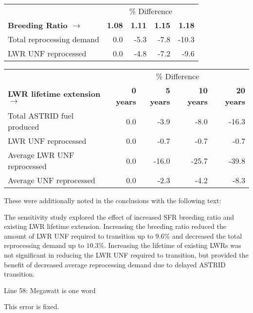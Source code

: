 \documentclass[answers,11pt]{exam}
\begin{document}
\begin{questions}
\begin{solution}
	\begin{tabular}{lrrrr}
		\hline
                & \multicolumn{4}{c}{\% Difference} \\
		\textbf{Breeding Ratio $\longrightarrow$}& \textbf{1.08}& \textbf{1.11} & \textbf{1.15} & \textbf{1.18} \\
		\hline
		Total reprocessing demand & 0.0 & -5.3 & -7.8 & -10.3 \\
		\gls{LWR} \gls{UNF} reprocessed & 0.0  & -4.8 & -7.2 & -9.6 \\
		\hline
	\end{tabular}


	\begin{tabular}{lrrrr}
		\hline
		& \multicolumn{4}{c}{\% Difference} \\
		\textbf{\gls{LWR} lifetime extension $\longrightarrow$}& \textbf{0 years}& \textbf{5 years} & \textbf{10 years} & \textbf{20 years} \\
		\hline
		Total \gls{ASTRID} fuel produced & 0.0 & -3.9 & -8.0 & -16.3 \\
		\gls{LWR} \gls{UNF} reprocessed & 0.0  & -0.7 & -0.7 & -0.7 \\
		Average \gls{LWR} \gls{UNF} reprocessed & 0.0 & -16.0 & -25.7 & -39.8 \\
		Average \gls{UNF} reprocessed & 0.0 & -2.3 & -4.2 & -8.3 \\
		\hline
	\end{tabular}

                 These were additionally noted in the conclusions with the 
                 following text: 
                 

The sensitivity study explored the effect of increased \gls{SFR} breeding
ratio and existing \gls{LWR} lifetime extension. Increasing the breeding
ratio reduced the amount of \gls{LWR} \gls{UNF} required to transition
up to $9.6\%$ and decreased the total reprocessing demand up to $10.3\%$.
Increasing the lifetime of existing \glspl{LWR} was not significant
in reducing the \gls{LWR} \gls{UNF} required to transition, but provided the benefit of
decreased average reprocessing demand due to delayed \gls{ASTRID} transition.

                
        \end{solution}

        \question Line 58: Megawatt is one word
        \begin{solution}
                This error is fixed.
        \end{solution}


\end{questions}
\end{document}
